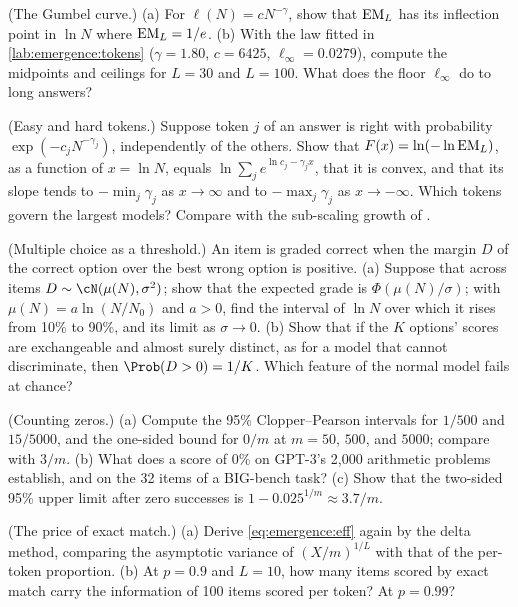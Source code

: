 \begin{refsection}
\begin{exercises}
\item \consolidation (The Gumbel curve.) (a) For $\ell(N)=cN^{-\gamma}$, show that $\mathrm{EM}_L$ has its inflection point in $\ln N$ where $\mathrm{EM}_L=1/e$. (b) With the law fitted in \cref{lab:emergence:tokens} ($\gamma=1.80$, $c=6425$, $\ell_\infty=0.0279$), compute the midpoints and ceilings for $L=30$ and $L=100$. What does the floor $\ell_\infty$ do to long answers?\label{ex:emergence:gumbel}

\item \consolidation\hard (Easy and hard tokens.) Suppose token $j$ of an answer is right with probability $\exp(-c_jN^{-\gamma_j})$, independently of the others. Show that $F(x)=\ln(-\ln\mathrm{EM}_L)$, as a function of $x=\ln N$, equals $\ln\sum_je^{\ln c_j-\gamma_jx}$, that it is convex, and that its slope tends to $-\min_j\gamma_j$ as $x\to\infty$ and to $-\max_j\gamma_j$ as $x\to-\infty$. Which tokens govern the largest models? Compare with the sub-scaling growth of \textcite{HuEtAl2024}. \label{ex:emergence:hetero}

\item \consolidation (Multiple choice as a threshold.) An item is graded correct when the margin $D$ of the correct option over the best wrong option is positive. (a) Suppose that across items $D\sim\cN(\mu(N),\sigma^2)$; show that the expected grade is $\Phi(\mu(N)/\sigma)$; with $\mu(N)=a\ln(N/N_0)$ and $a>0$, find the interval of $\ln N$ over which it rises from 10\% to 90\%, and its limit as $\sigma\to0$. (b) Show that if the $K$ options' scores are exchangeable and almost surely distinct, as for a model that cannot discriminate, then $\Prob(D>0)=1/K$. Which feature of the normal model fails at chance?\label{ex:emergence:mc}

\item \consolidation (Counting zeros.) (a) Compute the 95\% Clopper--Pearson intervals for $1/500$ and $15/5000$, and the one-sided bound for $0/m$ at $m=50$, $500$, and $5000$; compare with $3/m$. (b) What does a score of 0\% on GPT-3's 2,000 arithmetic problems establish, and on the 32 items of a BIG-bench task? (c) Show that the two-sided 95\% upper limit after zero successes is $1-0.025^{1/m}\approx3.7/m$.\label{ex:emergence:zeros}

\item \consolidation (The price of exact match.) (a) Derive \eqref{eq:emergence:eff} again by the delta method, comparing the asymptotic variance of $(X/m)^{1/L}$ with that of the per-token proportion. (b) At $p=0.9$ and $L=10$, how many items scored by exact match carry the information of 100 items scored per token? At $p=0.99$?\label{ex:emergence:eff}


\end{exercises}
\end{refsection}
